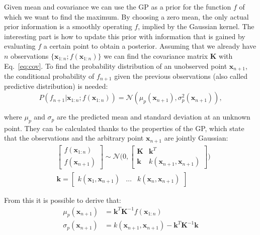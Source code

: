 Given mean and covariance we can use the GP as a prior for the function $f$ of
which we want to find the maximum. By choosing a zero mean, the only actual
prior information is a smoothly operating $f$, implied by the Gaussian kernel.
The interesting part is how to update this prior with information that is
gained by evaluating $f$ a certain point to obtain a posterior.  Assuming that
we already have $n$ observations $\{\mathbf{x}_{1:n} ; f(\mathbf{x}_{1:n})\}$
we can find the covariance matrix $\mathbf{K}$ with Eq.~\ref{eq:cov}.  To find
the probability distribution of an unobserved point $\mathbf{x}_{n+1}$, the
conditional probability of $f_{n+1}$ given the previous observations (also
called predictive distribution) is needed:
\begin{equation}
  P(f_{n+1} | \mathbf{x}_{1:n} ; f(\mathbf{x}_{1:n})) 
    = \mathcal{N}(\mu_p(\mathbf{x}_{n+1}) , \sigma_p^2(\mathbf{x}_{n+1})),
\end{equation}

where $\mu_p$ and $\sigma_p$ are the predicted mean and standard deviation at
an unknown point.  They can be calculated thanks to the properties of the GP,
which state that the observations and the arbitrary point $\mathbf{x}_{n+1}$
are jointly Gaussian:
\begin{align}
  &\begin{bmatrix} f(\mathbf{x}_{1:n}) \\ f(\mathbf{x}_{n+1}) \end{bmatrix}
  \sim \mathcal{N} \bigg(
    0,  \begin{bmatrix} 
           \mathbf{K} & \mathbf{k}^T \\ 
           \mathbf{k} & k(\mathbf{x}_{n+1}, \mathbf{x}_{n+1})
        \end{bmatrix}
  \bigg) \\
  &\mathbf{k} = \begin{bmatrix}
      k(\mathbf{x}_1, \mathbf{x}_{n+1}) &
      \dots &
      k(\mathbf{x}_n, \mathbf{x}_{n+1})
  \end{bmatrix}
\end{align}

From this it is possible to derive that:
\begin{align}
  \mu_p (\mathbf{x}_{n+1}) &= \mathbf{k}^T \mathbf{K}^{-1} f(\mathbf{x}_{1:n}) \\
  \sigma_p (\mathbf{x}_{n+1}) &= k(\mathbf{x}_{n+1}, \mathbf{x}_{n+1}) 
                               - \mathbf{k}^T \mathbf{K}^{-1} \mathbf{k}
\end{align}

